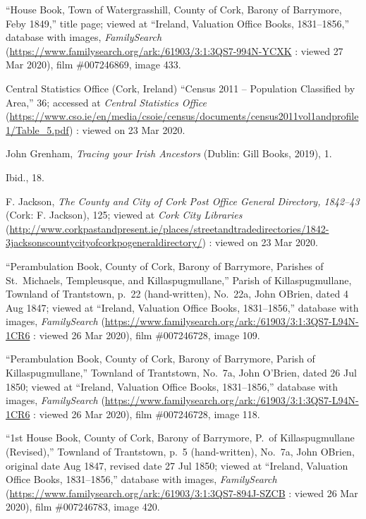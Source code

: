 \begin{thebibliography}{999}
``House Book, Town of Watergrasshill, County of Cork, Barony of Barrymore, Feby 1849,'' title page; viewed at ``Ireland, Valuation Office Books, 1831--1856,'' database with images, \textit{FamilySearch} (\url{https://www.familysearch.org/ark:/61903/3:1:3QS7-994N-YCXK} : viewed 27 Mar 2020), film \#007246869, image 433.

Central Statistics Office (Cork, Ireland) ``Census 2011 -- Population Classified by Area,'' 36; accessed at \textit{Central Statistics Office} (\url{https://www.cso.ie/en/media/csoie/census/documents/census2011vol1andprofile1/Table_5.pdf}) : viewed on 23 Mar 2020.

John Grenham, \textit{Tracing your Irish Ancestors} (Dublin: Gill Books, 2019), 1.

Ibid., 18.

F. Jackson, \textit{The County and City of Cork Post Office General Directory, 1842--43} (Cork: F. Jackson), 125; viewed at \textit{Cork City Libraries} (\url{http://www.corkpastandpresent.ie/places/streetandtradedirectories/1842-3jacksonscountycityofcorkpogeneraldirectory/}) : viewed on 23 Mar 2020.

``Perambulation Book, County of Cork, Barony of Barrymore, Parishes of St.\ Michaels, Templeusque, and Killaspugmullane,'' Parish of Killaspugmullane, Townland of Trantstown, p.\ 22 (hand-written), No.\ 22a, John OBrien, dated 4 Aug 1847; viewed at ``Ireland, Valuation Office Books, 1831--1856,'' database with images, \textit{FamilySearch} (\url{https://www.familysearch.org/ark:/61903/3:1:3QS7-L94N-1CR6} : viewed 26 Mar 2020), film \#007246728, image 109.

``Perambulation Book, County of Cork, Barony of Barrymore, Parish of Killaspugmullane,'' Townland of Trantstown, No.\ 7a, John O'Brien, dated 26 Jul 1850; viewed at ``Ireland, Valuation Office Books, 1831--1856,'' database with images, \textit{FamilySearch} (\url{https://www.familysearch.org/ark:/61903/3:1:3QS7-L94N-1CR6} : viewed 26 Mar 2020), film \#007246728, image 118.

``1st House Book, County of Cork, Barony of Barrymore, P.\ of Killaspugmullane (Revised),'' Townland of Trantstown, p.\ 5 (hand-written), No.\ 7a, John OBrien, original date Aug 1847, revised date 27 Jul 1850; viewed at ``Ireland, Valuation Office Books, 1831--1856,'' database with images, \textit{FamilySearch} (\url{https://www.familysearch.org/ark:/61903/3:1:3QS7-894J-SZCB} : viewed 26 Mar 2020), film \#007246783, image 420.


\end{thebibliography}
